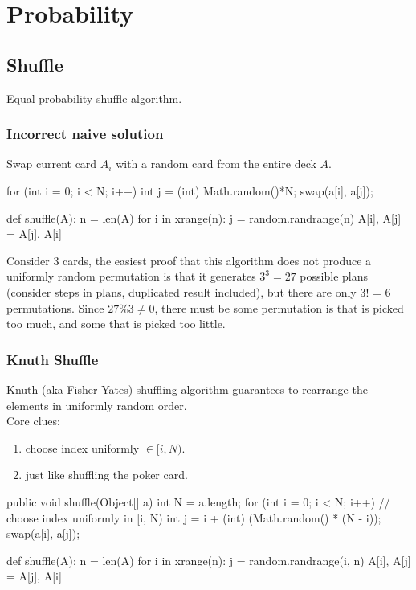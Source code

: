 \chapter{Probability}


\section{Shuffle}
Equal probability shuffle algorithm.

\subsection{Incorrect naive solution}
Swap current card $A_i$ with a random card from the entire deck $A$. 
\begin{java}
for (int i = 0; i < N; i++) {
   int j = (int) Math.random()*N;
   swap(a[i], a[j]);
}
\end{java}
\begin{python}
def shuffle(A):
  n = len(A)
  for i in xrange(n):
    j = random.randrange(n)
    A[i], A[j] = A[j], A[i]
\end{python}
Consider 3 cards, the easiest proof that this algorithm does not produce a uniformly random permutation is that it generates $3^3=27$ possible plans (consider steps in plans, duplicated result included), but there are only 3! = 6 permutations. Since $27\%3 \neq 0$, there must be some permutation is that is picked too much, and some that is picked too little.
\subsection{Knuth Shuffle}
Knuth (aka Fisher-Yates) shuffling algorithm guarantees to rearrange the elements in uniformly random order. 
\\
Core clues:
\begin{enumerate}
\item choose index uniformly $\in [i, N)$.
\item just like shuffling the poker card.
\end{enumerate}
\begin{java}
public void shuffle(Object[] a) {
    int N = a.length;
    for (int i = 0; i < N; i++) {
        // choose index uniformly in [i, N)
        int j = i + (int) (Math.random() * (N - i));
        swap(a[i], a[j]);
    }
}
\end{java}

\begin{python}
def shuffle(A):
  n = len(A)
  for i in xrange(n):
    j = random.randrange(i, n)
    A[i], A[j] = A[j], A[i]
\end{python}

